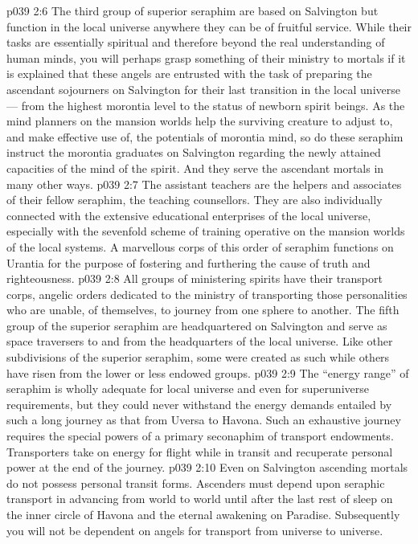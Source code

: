 \vs p039 2:6 \bibnobreakspace {} The third group of superior seraphim are based on Salvington but function in the local universe anywhere they can be of fruitful service. While their tasks are essentially spiritual and therefore beyond the real understanding of human minds, you will perhaps grasp something of their ministry to mortals if it is explained that these angels are entrusted with the task of preparing the ascendant sojourners on Salvington for their last transition in the local universe --- from the highest morontia level to the status of newborn spirit beings. As the mind planners on the mansion worlds help the surviving creature to adjust to, and make effective use of, the potentials of morontia mind, so do these seraphim instruct the morontia graduates on Salvington regarding the newly attained capacities of the mind of the spirit. And they serve the ascendant mortals in many other ways.
\vs p039 2:7 \bibnobreakspace {} The assistant teachers are the helpers and associates of their fellow seraphim, the teaching counsellors. They are also individually connected with the extensive educational enterprises of the local universe, especially with the sevenfold scheme of training operative on the mansion worlds of the local systems. A marvellous corps of this order of seraphim functions on Urantia for the purpose of fostering and furthering the cause of truth and righteousness.
\vs p039 2:8 \bibnobreakspace {} All groups of ministering spirits have their transport corps, angelic orders dedicated to the ministry of transporting those personalities who are unable, of themselves, to journey from one sphere to another. The fifth group of the superior seraphim are headquartered on Salvington and serve as space traversers to and from the headquarters of the local universe. Like other subdivisions of the superior seraphim, some were created as such while others have risen from the lower or less endowed groups.
\vs p039 2:9 \pc The “energy range” of seraphim is wholly adequate for local universe and even for superuniverse requirements, but they could never withstand the energy demands entailed by such a long journey as that from Uversa to Havona. Such an exhaustive journey requires the special powers of a primary seconaphim of transport endowments. Transporters take on energy for flight while in transit and recuperate personal power at the end of the journey.
\vs p039 2:10 \pc Even on Salvington ascending mortals do not possess personal transit forms. Ascenders must depend upon seraphic transport in advancing from world to world until after the last rest of sleep on the inner circle of Havona and the eternal awakening on Paradise. Subsequently you will not be dependent on angels for transport from universe to universe.
